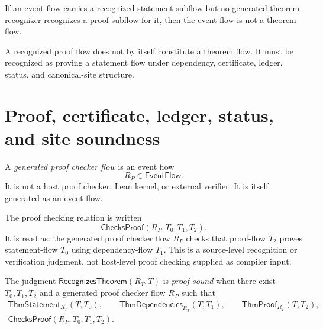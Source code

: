 \begin{corollary}
\label{cor:theorem-generated-statement-alone-not-theorem}
If an event flow carries a recognized statement subflow but no generated theorem recognizer recognizes a proof subflow for it, then the event flow is not a theorem flow.
\end{corollary}

\begin{corollary}
\label{cor:theorem-generated-proof-alone-not-theorem}
A recognized proof flow does not by itself constitute a theorem flow. It must be recognized as proving a statement flow under dependency, certificate, ledger, status, and canonical-site structure.
\end{corollary}

\section{Proof, certificate, ledger, status, and site soundness}
\label{sec:theorem-generated-soundness}

\begin{definition}
\label{def:theorem-generated-proof-checker-flow}
A \emph{generated proof checker flow} is an event flow
$$
  R_P \in \mathsf{EventFlow}.
$$
It is not a host proof checker, Lean kernel, or external verifier. It is itself generated as an event flow.
\end{definition}

\begin{definition}
\label{def:theorem-generated-proof-checking-relation}
The proof checking relation is written
$$
  \mathsf{ChecksProof}(R_P,T_0,T_1,T_2).
$$
It is read as: the generated proof checker flow $R_P$ checks that proof-flow $T_2$ proves statement-flow $T_0$ using dependency-flow $T_1$. This is a source-level recognition or verification judgment, not host-level proof checking supplied as compiler input.
\end{definition}

\begin{definition}
\label{def:theorem-generated-proof-sound}
The judgment $\mathsf{RecognizesTheorem}(R_T,T)$ is \emph{proof-sound} when there exist $T_0,T_1,T_2$ and a generated proof checker flow $R_P$ such that
$$
\begin{gathered}
  \mathsf{ThmStatement}_{R_T}(T,T_0),\qquad
  \mathsf{ThmDependencies}_{R_T}(T,T_1),\qquad
  \mathsf{ThmProof}_{R_T}(T,T_2),\\
  \mathsf{ChecksProof}(R_P,T_0,T_1,T_2).
\end{gathered}
$$
\end{definition}

